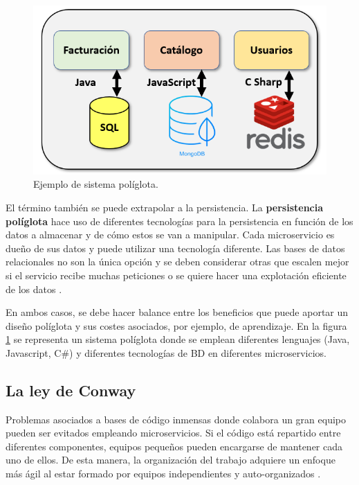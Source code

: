\documentclass[11pt,spanish,listoffigures]{tfgetsinf}
\begin{document}
\begin{figure}[h]
\centering
\includegraphics[scale=0.65]{poliglota}
\caption{Ejemplo de sistema políglota.}
\label{fig:poliglota}
\end{figure}

El término también se puede extrapolar a la persistencia. La \textbf{persistencia políglota} hace uso de diferentes tecnologías para la persistencia en función de los datos a almacenar y de cómo estos se van a manipular. Cada microservicio es dueño de sus datos y puede utilizar una tecnología diferente. Las bases de datos relacionales no son la única opción y se deben considerar otras que escalen mejor si el servicio recibe muchas peticiones o se quiere hacer una explotación eficiente de los datos \cite{Fowler2011}.

En ambos casos, se debe hacer balance entre los beneficios que puede aportar un diseño políglota y sus costes asociados, por ejemplo, de aprendizaje. En la figura \ref{fig:poliglota} se representa un sistema políglota donde se emplean diferentes lenguajes (Java, Javascript, C\#) y diferentes tecnologías de BD en diferentes microservicios.

\subsection{La ley de Conway \cite{Conway1968}}

Problemas asociados a bases de código inmensas donde colabora un gran equipo pueden ser evitados empleando microservicios. Si el código está repartido entre diferentes componentes, equipos pequeños pueden encargarse de mantener cada uno de ellos. De esta manera, la organización del trabajo adquiere un enfoque más ágil al estar formado por equipos independientes y auto-organizados \cite{Newman2015a}.
\end{document}
